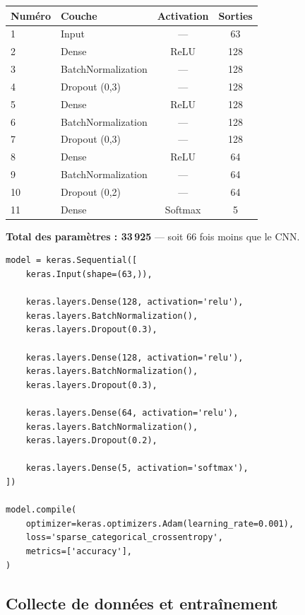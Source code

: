 \documentclass[12pt, a4paper]{article}
\begin{document}
\begin{center}
\begin{tabular}{@{}llcc@{}}
  \toprule
  \textbf{Numéro} & \textbf{Couche} & \textbf{Activation} & \textbf{Sorties} \\
  \midrule
  1 & Input & --- & 63 \\
  2 & Dense & ReLU & 128 \\
  3 & BatchNormalization & --- & 128 \\
  4 & Dropout (0,3) & --- & 128 \\
  5 & Dense & ReLU & 128 \\
  6 & BatchNormalization & --- & 128 \\
  7 & Dropout (0,3) & --- & 128 \\
  8 & Dense & ReLU & 64 \\
  9 & BatchNormalization & --- & 64 \\
  10 & Dropout (0,2) & --- & 64 \\
  11 & Dense & Softmax & 5 \\
  \bottomrule
\end{tabular}
\end{center}

\textbf{Total des paramètres : 33\,925} --- soit 66 fois moins que le CNN.

\begin{lstlisting}[caption={Architecture du réseau dense (extrait de
                   \texttt{4\_entrainer\_landmarks.py})},
                   label=lst:mlp_arch]
model = keras.Sequential([
    keras.Input(shape=(63,)),

    keras.layers.Dense(128, activation='relu'),
    keras.layers.BatchNormalization(),
    keras.layers.Dropout(0.3),

    keras.layers.Dense(128, activation='relu'),
    keras.layers.BatchNormalization(),
    keras.layers.Dropout(0.3),

    keras.layers.Dense(64, activation='relu'),
    keras.layers.BatchNormalization(),
    keras.layers.Dropout(0.2),

    keras.layers.Dense(5, activation='softmax'),
])

model.compile(
    optimizer=keras.optimizers.Adam(learning_rate=0.001),
    loss='sparse_categorical_crossentropy',
    metrics=['accuracy'],
)
\end{lstlisting}

\subsection{Collecte de données et entraînement}
\end{document}
